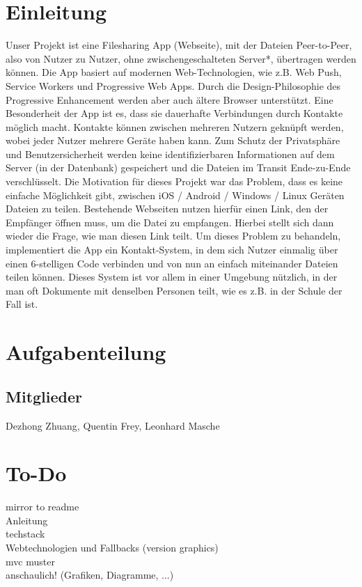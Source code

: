 \documentclass[a4paper]{article}
\begin{document}
  \setcounter{tocdepth}{1}
  \tableofcontents
  \newpage

  \section{Einleitung}
  Unser Projekt ist eine Filesharing App (Webseite), mit der Dateien Peer-to-Peer, also von Nutzer zu Nutzer, ohne zwischengeschalteten Server*, übertragen werden können. Die App basiert auf modernen Web-Technologien, wie z.B. Web Push, Service Workers und Progressive Web Apps. Durch die Design-Philosophie des Progressive Enhancement werden aber auch ältere Browser unterstützt. Eine Besonderheit der App ist es, dass sie dauerhafte Verbindungen durch Kontakte möglich macht. Kontakte können zwischen mehreren Nutzern geknüpft werden, wobei jeder Nutzer mehrere Geräte haben kann. Zum Schutz der Privatsphäre und Benutzersicherheit werden keine identifizierbaren Informationen auf dem Server (in der Datenbank) gespeichert und die Dateien im Transit Ende-zu-Ende verschlüsselt.
  Die Motivation für dieses Projekt war das Problem, dass es keine einfache Möglichkeit gibt, zwischen iOS / Android / Windows / Linux Geräten Dateien zu teilen. Bestehende Webseiten nutzen hierfür einen Link, den der Empfänger öffnen muss, um die Datei zu empfangen. Hierbei stellt sich dann wieder die Frage, wie man diesen Link teilt. Um dieses Problem zu behandeln, implementiert die App ein Kontakt-System, in dem sich Nutzer einmalig über einen 6-stelligen Code verbinden und von nun an einfach miteinander Dateien teilen können. Dieses System ist vor allem in einer Umgebung nützlich, in der man oft Dokumente mit denselben Personen teilt, wie es z.B. in der Schule der Fall ist.

  \section{Aufgabenteilung}

  \subsection*{Mitglieder}
  Dezhong Zhuang, Quentin Frey, Leonhard Masche

  \section{To-Do}
  mirror to readme\\
  Anleitung\\
  techstack\\
  Webtechnologien und Fallbacks (version graphics)\\
  mvc muster\\
  anschaulich! (Grafiken, Diagramme, ...)
\end{document}
